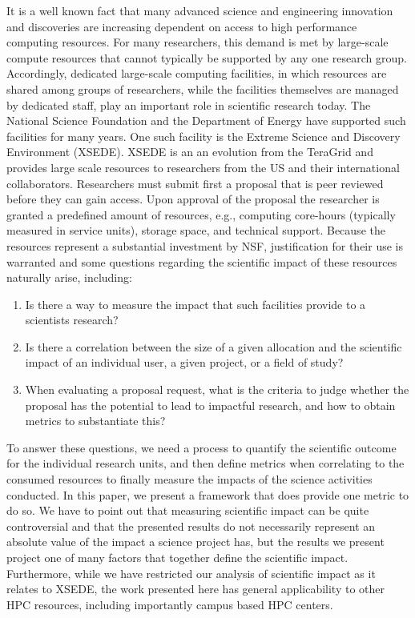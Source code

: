 \documentclass{sig-alternate}
\begin{document}
It is a well known fact that many advanced science and engineering innovation and discoveries are increasing dependent on access to high performance computing resources. For many researchers, this demand is met by large-scale compute resources that cannot typically be supported by any one research group. Accordingly, dedicated large-scale computing facilities, in which resources are shared among groups of researchers, while the facilities themselves are managed by dedicated staff, play an important role in scientific research today. The National Science Foundation and the Department of Energy have supported such facilities for many years. One such facility is the Extreme Science and Discovery Environment (XSEDE). XSEDE is an an evolution from the TeraGrid \cite{www-xsede} and provides large scale resources to researchers from the US and their international collaborators. Researchers must submit first a proposal that is peer reviewed before they can gain access. Upon approval of the proposal the researcher is granted a predefined amount of resources, e.g., computing core-hours (typically measured in service units), storage space, and technical support. Because the resources represent a substantial investment by NSF, justification for their use is warranted and some questions regarding the scientific impact of these resources naturally arise, including:

\begin{enumerate} 
\item Is there a way to measure the impact that such facilities provide to a scientists research?
 
\item Is there a correlation between the size of a given allocation and the scientific impact of an individual user, a given project, or a field of study?  
 
\item When evaluating a proposal request, what is the criteria to judge whether the proposal has the potential to lead to impactful research, and how to obtain metrics to substantiate this? 
\end{enumerate} 

To answer these questions, we need a process to quantify the scientific outcome for the individual research units, and then define metrics when correlating to the consumed resources to finally measure the impacts of the science activities conducted. In this paper, we present a framework that does provide one metric to do so. We have to point out that measuring scientific impact can be quite controversial and that the presented results do not necessarily represent an absolute value of the impact a science project has, but the results we present project one of many factors that together define the scientific impact.
Furthermore, while we have restricted our analysis of scientific impact as it relates to XSEDE, the work presented here has general applicability to other HPC resources, including importantly campus based HPC centers.  
\end{document}
